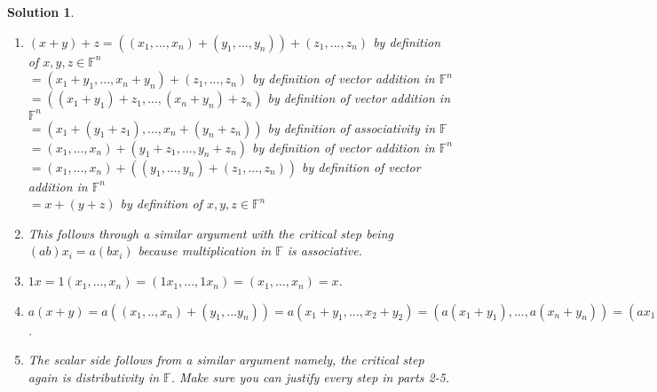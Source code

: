 \documentclass{article}
\theoremstyle{problemstyle}
\theoremstyle{problemstyle}
\newtheorem{solution}{Solution}
\begin{document}
\begin{solution}
\begin{enumerate}
\item $(x+y)+z = ((x_1, ..., x_n)+(y_1, ..., y_n))+(z_1,...,z_n)$ by definition of $x,y,z\in\mathbb{F}^n$\\
$= (x_1+y_1,...,x_n+y_n)+(z_1,...,z_n)$ by definition of vector addition in $\mathbb{F}^n$\\
$= ((x_1+y_1)+z_1,...,(x_n+y_n)+z_n)$ by definition of vector addition in $\mathbb{F}^n$\\
$= (x_1+(y_1+z_1),...,x_n+(y_n+z_n))$ by definition of associativity in $\mathbb{F}$\\
$= (x_1, ..., x_n)+(y_1+z_1,...,y_n+z_n)$ by definition of vector addition in $\mathbb{F}^n$\\
$= (x_1, ..., x_n)+((y_1, ..., y_n)+(z_1,...,z_n))$ by definition of vector addition in $\mathbb{F}^n$\\
$= x+(y+z)$ by definition of $x,y,z\in\mathbb{F}^n$
\item This follows through a similar argument with the critical step being $(ab)x_i = a(bx_i)$ because multiplication in $\mathbb{F}$ is associative. 
\item $1x =1(x_1,...,x_n) = (1x_1,...,1x_n) = (x_1,...,x_n) = x$. 
\item $a(x+y) = a((x_1,..,x_n)+(y_1,...y_n)) = a(x_1+y_1,...,x_2+y_2) = (a(x_1+y_1),...,a(x_n+y_n)) = (ax_1+ay_1,...,ax_n+ay_n) = (ax_1,..,ax_n)+(ay_1,...ay_n) = a(x_1,..,x_n)+a(y_1,...y_n) = ax + ay$.
\item The scalar side follows from a similar argument namely, the critical step again is distributivity in $\mathbb{F}$. Make sure you can justify every step in parts 2-5. 
\end{enumerate}
\end{solution}
\end{document}
